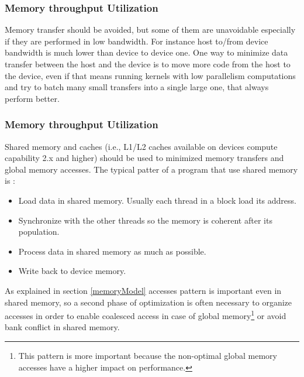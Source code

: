\subsubsection{Memory throughput Utilization}
Memory transfer should be avoided, but some of them are
unavoidable especially if they are performed in low bandwidth. For instance
host to/from device bandwidth is much lower than device to device one.
One way to minimize data transfer between the host and the device is to move
more code from the host to the device, even if that means running kernels with
low parallelism computations and try to batch many small transfers into a single
large one, that always perform better.

\subsubsection{Memory throughput Utilization}

Shared memory and caches (i.e., L1/L2 caches available on devices compute
capability 2.x and higher) should be used to minimized memory transfers and
global memory accesses. The typical patter of a program that use shared memory
is :
\begin{itemize}%
  \renewcommand{\labelitemi}{$\diamondsuit$}
  \item Load data in shared memory. Usually each thread in a block load its
  address.
  \item Synchronize with the other threads so the memory is coherent after its
  population.
  \item Process data in shared memory as much as possible.
  \item Write back to device memory.
\end{itemize}
As explained in section \ref{memoryModel} accesses pattern is important even in
shared memory, so a second phase of optimization is often necessary to organize
accesses in order to enable coalesced access in case of global
memory\footnote{This pattern is more important because the non-optimal global
memory accesses have a higher impact on performance.} or avoid bank conflict
in shared memory.
